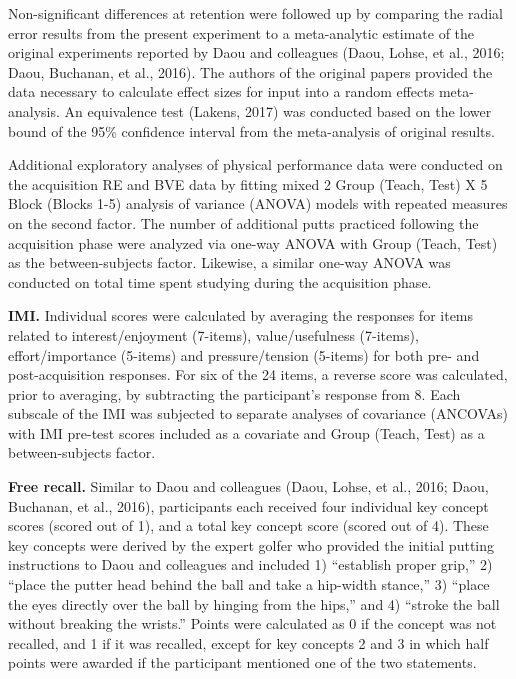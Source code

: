 \documentclass[
  english,
  man,floatsintext]{apa7}
\begin{document}
Non-significant differences at retention were followed up by comparing the radial error results from the present experiment to a meta-analytic estimate of the original experiments reported by Daou and colleagues (Daou, Lohse, et al., 2016; Daou, Buchanan, et al., 2016). The authors of the original papers provided the data necessary to calculate effect sizes for input into a random effects meta-analysis. An equivalence test (Lakens, 2017) was conducted based on the lower bound of the 95\% confidence interval from the meta-analysis of original results.

Additional exploratory analyses of physical performance data were conducted on the acquisition RE and BVE data by fitting mixed 2 Group (Teach, Test) X 5 Block (Blocks 1-5) analysis of variance (ANOVA) models with repeated measures on the second factor. The number of additional putts practiced following the acquisition phase were analyzed via one-way ANOVA with Group (Teach, Test) as the between-subjects factor. Likewise, a similar one-way ANOVA was conducted on total time spent studying during the acquisition phase.

\textbf{IMI.} Individual scores were calculated by averaging the responses for items related to interest/enjoyment (7-items), value/usefulness (7-items), effort/importance (5-items) and pressure/tension (5-items) for both pre- and post-acquisition responses. For six of the 24 items, a reverse score was calculated, prior to averaging, by subtracting the participant's response from 8. Each subscale of the IMI was subjected to separate analyses of covariance (ANCOVAs) with IMI pre-test scores included as a covariate and Group (Teach, Test) as a between-subjects factor.

\textbf{Free recall.} Similar to Daou and colleagues (Daou, Lohse, et al., 2016; Daou, Buchanan, et al., 2016), participants each received four individual key concept scores (scored out of 1), and a total key concept score (scored out of 4). These key concepts were derived by the expert golfer who provided the initial putting instructions to Daou and colleagues and included 1) ``establish proper grip,'' 2) ``place the putter head behind the ball and take a hip-width stance,'' 3) ``place the eyes directly over the ball by hinging from the hips,'' and 4) ``stroke the ball without breaking the wrists.'' Points were calculated as 0 if the concept was not recalled, and 1 if it was recalled, except for key concepts 2 and 3 in which half points were awarded if the participant mentioned one of the two statements.
\end{document}
